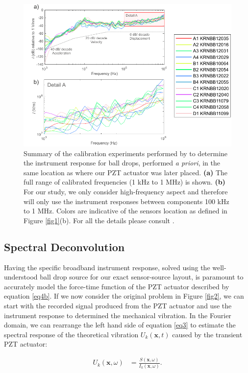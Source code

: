 \documentclass[preprint,3p, 11pt,authoryear]{elsarticle}
\begin{document}
{\begin{figure}[ht]
     	\centering
\includegraphics[scale= 1.0]{FIG6.pdf} 
\caption{Summary of the calibration experiments performed by \citet{Wu} to determine the instrument response for ball drops, performed \textit{a priori}, in the same location as where our PZT actuator was later placed. \textbf{(a)} The full range of calibrated frequencies (1 kHz to 1 MHz) is shown. \textbf{(b)} For our study, we only consider high-frequency aspect and therefore will only use the instrument responses between components 100 kHz to 1 MHz.  Colors are indicative of the sensors location as defined in Figure \ref{fig1}(b). For all the details please consult \citet{Wu}. }
	\label{fig6} 
\end{figure}

\subsection{Spectral Deconvolution}
\label{Spec_deconv}
Having the specific broadband instrument response, solved using the well-understood ball drop source for our exact sensor-source layout, is paramount to accurately model the force-time function of the PZT actuator described by equation \eqref{eq4b}.   If we now consider the original problem in Figure \ref{fig2}, we can start with the recorded signal produced from the PZT actuator and use the instrument response to determined the mechanical vibration.  In the Fourier domain, we can rearrange the left hand side of equation \eqref{eq3} to estimate the spectral response of the theoretical vibration $U_{k}(\mathbf{x},t)$ caused by the transient PZT actuator:

\begin{equation}
    \label{eq6}
\begin{split}
U_{k}\left( \mathbf{x}, \omega \right) & = 
        \frac{S\left( \mathbf{x}, \omega \right) }{ I_{k}\left( \mathbf{x},\omega \right)}.
\end{split}
\end{equation}

}
\end{document}
